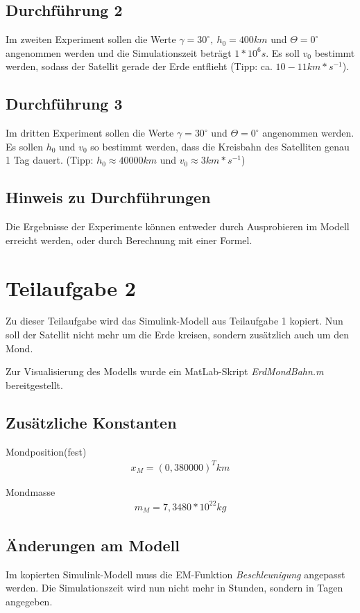 \documentclass[]{scrartcl}
\begin{document}
\subsection{Durchführung 2}
Im zweiten Experiment sollen die Werte $\gamma = 30^\circ,\ h_{0} = 400km$ und $\Theta=0^\circ$ angenommen werden und die Simulationszeit beträgt $1 * 10^6s$. Es soll $v_{0}$ bestimmt werden, sodass der Satellit gerade der Erde entflieht (Tipp: ca. $10 - 11 km*s^{-1}$).

\subsection{Durchführung 3}
Im dritten Experiment sollen die Werte $\gamma = 30^\circ$ und $\Theta = 0^\circ$ angenommen werden. Es sollen $h_{0}$ und $v_{0}$ so bestimmt werden, dass die Kreisbahn des Satelliten genau 1 Tag dauert. (Tipp: $h_{0} \approx 40000 km$ und $v_{0} \approx 3 km *s ^{-1}$)

\subsection{Hinweis zu Durchführungen}
Die Ergebnisse der Experimente können entweder durch Ausprobieren im Modell erreicht werden, oder durch Berechnung mit einer Formel.

\section{Teilaufgabe 2}
Zu dieser Teilaufgabe wird das Simulink-Modell aus Teilaufgabe 1 kopiert. Nun soll der Satellit nicht mehr um die Erde kreisen, sondern zusätzlich auch um den Mond.

Zur Visualisierung des Modells wurde ein MatLab-Skript \textit{ErdMondBahn.m} bereitgestellt.

\subsection{Zusätzliche Konstanten}
Mondposition(fest)
\begin{align}
x_{M} = (0,380000)^T km
\end{align}

Mondmasse
\begin{align}
m_{M} = 7,3480 * 10^{22} kg
\end{align}

\subsection{Änderungen am Modell}
Im kopierten Simulink-Modell muss die EM-Funktion \textit{Beschleunigung} angepasst werden. %
Die Simulationszeit wird nun nicht mehr in Stunden, sondern in Tagen angegeben.
\end{document}
